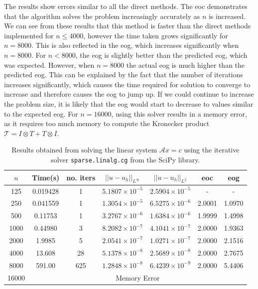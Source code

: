 \documentclass[11pt]{article}
\numberwithin{equation}{section}
\begin{document}
The results show errors similar to all the direct methods. The eoc demonstrates that the algorithm solves the problem increasingly accurately as $n$ is increased. We can see from these results that this method is faster than the direct methods implemented for $n \leq 4000$, however the time taken grows significantly for $n=8000$. This is also reflected in the eog, which increases significantly when $n=8000$. For $n<8000$, the eog is slightly better than the predicted eog, which was expected. However, when $n=8000$ the actual eog is much higher than the predicted eog. This can be explained by the fact that the number of iterations increases significantly, which causes the time required for solution to converge to increase and therefore causes the eog to jump up. If we could continue to increase the problem size, it is likely that the eog would start to decrease to values similar to the expected eog.
For $n=16000$, using this solver results in a memory error, as it requires too much memory to compute the Kronecker product $\mathcal{T} = I \otimes T + T \otimes I$.

\begin{table}[H]
\centering
\begin{tabular}{|c|c|c|c|c|c|c|}
\hline
$n$ & Time(s) & no. iters & $|| u - u_h ||_{L^{\infty}}$ &$|| u - u_h ||_{L^{2}}$ & eoc & eog \\
\hline
125 & 0.019428 & 1 & $5.1807 \times 10^{-5}$ & $2.5904 \times 10^{-5}$ & - & - \\
250 & 0.041559 & 1 & $1.3054 \times 10^{-5}$ & $6.5275 \times 10^{-6}$ & 2.0001 & 1.0970 \\
500 & 0.11753 & 1 & $3.2767 \times 10^{-6}$ & $1.6384 \times 10^{-6}$ & 1.9999 & 1.4998 \\
1000 & 0.44980 & 3 & $8.2082 \times 10^{-7}$ & $4.1041 \times 10^{-7}$ & 2.0000 & 1.9363 \\
2000 & 1.9985 & 5 & $2.0541 \times 10^{-7}$ & $1.0271 \times 10^{-7}$ & 2.0000 & 2.1516 \\
4000 & 13.608 & 28 & $5.1378 \times 10^{-8}$ & $2.5689 \times 10^{-8}$ & 2.0000 & 2.7675 \\
8000 & 591.00 & 625 & $1.2848 \times 10^{-8}$ & $6.4239 \times 10^{-9}$ & 2.0000 & 5.4406 \\
\cline{2-7}
16000 & \multicolumn{6}{c|}{Memory Error} \\
\hline
\end{tabular}
\captionsetup{justification=centering}
\caption{Results obtained from solving the linear system $\mathcal{A} x = c$ using the iterative solver  \texttt{sparse.linalg.cg} from the SciPy library.}
\label{table:kron it}
\end{table}
\end{document}

